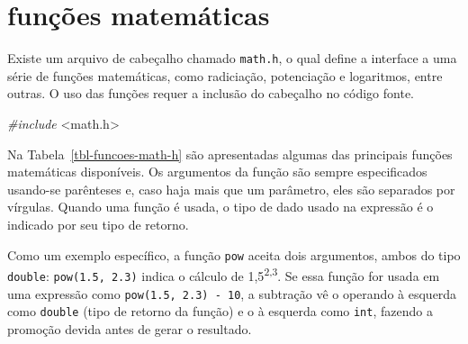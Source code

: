 \documentclass[
  11pt,
  a4paper,
]{scrbook}
\newenvironment{Shaded}{\begin{snugshade}}{\end{snugshade}}
\newcommand{\ImportTok}[1]{#1}
\newcommand{\PreprocessorTok}[1]{\textcolor[rgb]{0.56,0.35,0.01}{\textit{#1}}}
\begin{document}
\section{funções matemáticas}\label{funuxe7uxf5es-matemuxe1ticas}

Existe um arquivo de cabeçalho chamado \texttt{math.h}, o qual define a
interface a uma série de funções matemáticas, como radiciação,
potenciação e logaritmos, entre outras. O uso das funções requer a
inclusão do cabeçalho no código fonte.

\begin{Shaded}
\begin{Highlighting}[]
\PreprocessorTok{\#include }\ImportTok{\textless{}math.h\textgreater{}}
\end{Highlighting}
\end{Shaded}

Na Tabela~\ref{tbl-funcoes-math-h} são apresentadas algumas das
principais funções matemáticas disponíveis. Os argumentos da função são
sempre especificados usando-se parênteses e, caso haja mais que um
parâmetro, eles são separados por vírgulas. Quando uma função é usada, o
tipo de dado usado na expressão é o indicado por seu tipo de retorno.

Como um exemplo específico, a função \texttt{pow} aceita dois
argumentos, ambos do tipo \texttt{double}: \texttt{pow(1.5,\ 2.3)}
indica o cálculo de 1,5\textsuperscript{2,3}. Se essa função for usada
em uma expressão como \texttt{pow(1.5,\ 2.3)\ -\ 10}, a subtração vê o
operando à esquerda como \texttt{double} (tipo de retorno da função) e o
à esquerda como \texttt{int}, fazendo a promoção devida antes de gerar o
resultado.
\end{document}
